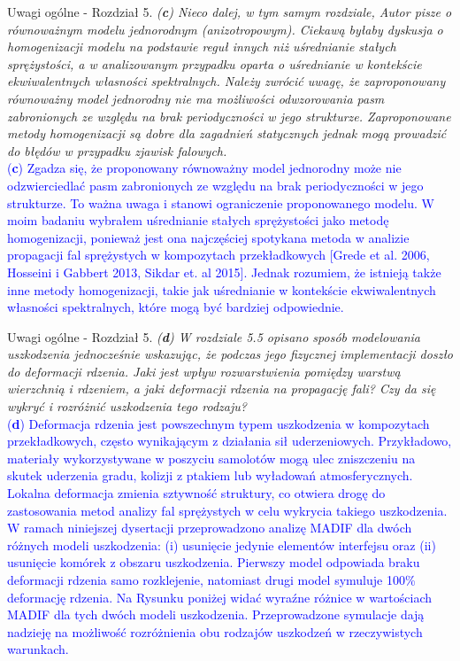\documentclass[10pt,aspectratio=169]{beamer} %
\begin{document}
\begin{frame}[label=frame15]{Uwagi ogólne - Rozdział 5.}\justifying
\textit{(\textbf{c}) Nieco dalej, w tym samym rozdziale, Autor pisze o równoważnym modelu jednorodnym (anizotropowym). Ciekawą byłaby dyskusja o homogenizacji modelu na podstawie reguł innych niż uśrednianie stałych sprężystości, a w analizowanym przypadku oparta o uśrednianie w kontekście ekwiwalentnych własności spektralnych. Należy zwrócić uwagę, że zaproponowany równoważny model jednorodny nie ma możliwości odwzorowania pasm zabronionych ze względu na brak periodyczności w jego strukturze. Zaproponowane metody homogenizacji są dobre dla zagadnień statycznych jednak mogą prowadzić do błędów w przypadku zjawisk falowych.}\\
\textcolor{blue}{(\textbf{c}) Zgadza się, że proponowany równoważny model jednorodny może nie odzwierciedlać pasm zabronionych ze względu na brak periodyczności w jego strukturze. To ważna uwaga i stanowi ograniczenie proponowanego modelu. W moim badaniu wybrałem uśrednianie stałych sprężystości jako metodę homogenizacji, ponieważ jest ona najczęściej spotykana metoda w analizie propagacji fal sprężystych w kompozytach przekładkowych [Grede et al. 2006, Hosseini i Gabbert 2013, Sikdar et. al 2015].  Jednak rozumiem, że istnieją także inne metody homogenizacji, takie jak uśrednianie w kontekście ekwiwalentnych własności spektralnych, które mogą być bardziej odpowiednie.}
\end{frame}
\begin{frame}[label=frame16]{Uwagi ogólne - Rozdział 5.}\justifying
\textit{(\textbf{d}) W rozdziale 5.5 opisano sposób modelowania uszkodzenia jednocześnie wskazując, że podczas jego fizycznej implementacji doszło do deformacji rdzenia. Jaki jest wpływ rozwarstwienia pomiędzy warstwą wierzchnią i rdzeniem, a jaki deformacji rdzenia na propagację fali? Czy da się wykryć i rozróżnić uszkodzenia tego rodzaju?}\\
\textcolor{blue}{(\textbf{d}) Deformacja rdzenia jest powszechnym typem uszkodzenia w kompozytach przekładkowych, często wynikającym z działania sił uderzeniowych. Przykładowo, materiały wykorzystywane w poszyciu samolotów mogą ulec zniszczeniu na skutek uderzenia gradu, kolizji z ptakiem lub wyładowań atmosferycznych. Lokalna deformacja zmienia sztywność struktury, co otwiera drogę do zastosowania metod analizy fal sprężystych w celu wykrycia takiego uszkodzenia.\\
W ramach niniejszej dysertacji przeprowadzono analizę MADIF dla dwóch różnych modeli uszkodzenia: (i) usunięcie jedynie elementów interfejsu oraz (ii) usunięcie komórek z obszaru uszkodzenia. Pierwszy model odpowiada braku deformacji rdzenia samo rozklejenie, natomiast drugi model symuluje 100\% deformację rdzenia. Na Rysunku poniżej widać wyraźne różnice w wartościach MADIF dla tych dwóch modeli uszkodzenia. Przeprowadzone symulacje dają nadzieję na możliwość rozróżnienia obu rodzajów uszkodzeń w rzeczywistych warunkach.}
\end{frame}
\end{document}
